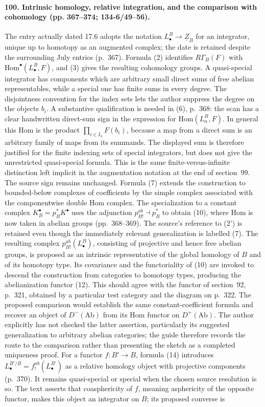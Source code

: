 \paragraph{100. Intrinsic homology, relative integration, and the comparison with cohomology (pp. 367--374; 134-6/49--56).}
The entry actually dated 17.6 adopts the notation $L^B_{\bullet}\to\underline Z_B$ for an integrator, unique up to homotopy as an augmented complex; the date is retained despite the surrounding July entries (p.~367). Formula (2) identifies $R\Gamma_B(F)$ with $\mathrm{Hom}^{\bullet}(L^B_{\bullet},F)$, and (3) gives the resulting cohomology groups. A quasi-special integrator has components which are arbitrary small direct sums of free abelian representables, while a special one has finite sums in every degree. The disjointness convention for the index sets lets the author suppress the degree on the objects $b_i$. A substantive qualification is needed in (6), p.~368: the scan has a clear handwritten direct-sum sign in the expression for $\mathrm{Hom}(L_n^B,F)$. In general this Hom is the product $\prod_{i\in I_n}F(b_i)$, because a map from a direct sum is an arbitrary family of maps from its summands. The displayed sum is therefore justified for the finite indexing sets of special integrators, but does not give the unrestricted quasi-special formula. This is the same finite-versus-infinite distinction left implicit in the augmentation notation at the end of section~99. The source sign remains unchanged. Formula (7) extends the construction to bounded-below complexes of coefficients by the simple complex associated with the componentwise double Hom complex. The specialization to a constant complex $K_B^{\bullet}=p_B^*K^{\bullet}$ uses the adjunction $p_{B!}^{ab}\dashv p_B^*$ to obtain (10), where Hom is now taken in abelian groups (pp.~368--369). The source's reference to (2') is retained even though the immediately relevant generalization is labelled (7). The resulting complex $p_{B!}^{ab}(L^B_{\bullet})$, consisting of projective and hence free abelian groups, is proposed as an intrinsic representative of the global homology of $B$ and of its homotopy type. Its covariance and the functoriality of (10) are invoked to descend the construction from categories to homotopy types, producing the abelianization functor (12). This should agree with the functor of section~92, p.~321, obtained by a particular test category and the diagram on p.~322. The proposed comparison would establish the same constant-coefficient formula and recover an object of $D^-(\mathrm{Ab})$ from its Hom functor on $D^+(\mathrm{Ab})$. The author explicitly has not checked the latter assertion, particularly its suggested generalization to arbitrary abelian categories; the guide therefore records the route to the comparison rather than presenting the sketch as a completed uniqueness proof. For a functor $f:B'\to B$, formula (14) introduces $L^{B'/B}_{\bullet}=f_!^{ab}(L^{B'}_{\bullet})$ as a relative homology object with projective components (p.~370). It remains quasi-special or special when the chosen source resolution is so. The text asserts that coasphericity of $f$, meaning asphericity of the opposite functor, makes this object an integrator on $B$; its proposed converse is 